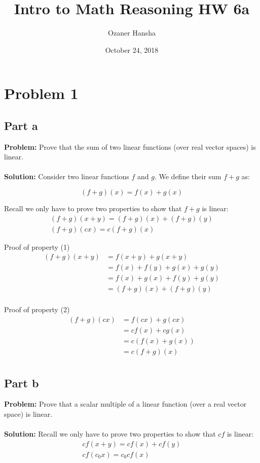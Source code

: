 \documentclass{article}
\begin{document}
\title{Intro to Math Reasoning HW 6a}
\author{Ozaner Hansha}
\date{October 24, 2018}
\maketitle

\section*{Problem 1}
\subsection*{Part a}
\textbf{Problem:} Prove that the sum of two linear functions (over real vector spaces) is linear.
\\\\
\textbf{Solution:} Consider two linear functions $f$ and $g$. We define their sum $f+g$ as:

$$(f+g)(x)=f(x)+g(x)$$

Recall we only have to prove two properties to show that $f+g$ is linear:
\begin{gather}
(f+g)(x+y)=(f+g)(x)+(f+g)(y)\\
(f+g)(cx)=c(f+g)(x)
\end{gather}

Proof of property (1)
\begin{align*}
  (f+g)(x+y)&=f(x+y)+g(x+y)\tag{def. of $f+g$}\\
  &=f(x)+f(y)+g(x)+g(y)\tag{Linearity of $f$ \& $g$}\\
  &=f(x)+g(x)+f(y)+g(y)\tag{Commutativity of $+$}\\
  &=(f+g)(x)+(f+g)(y)\tag{def. of $f+g$}\\
\end{align*}

Proof of property (2)
\begin{align*}
  (f+g)(cx)&=f(cx)+g(cx)\tag{def. of $f+g$}\\
  &=cf(x)+cg(x)\tag{Linearity of $f$ \& $g$}\\
  &=c(f(x)+g(x))\tag{Distributivity of $+$ \& $\times$}\\
  &=c(f+g)(x)\tag{def. of $f+g$}\\
\end{align*}

\subsection*{Part b}
\textbf{Problem:} Prove that a scalar multiple of a linear function (over a real vector space) is linear.
\\\\
\textbf{Solution:} Recall we only have to prove two properties to show that $cf$ is linear:
\begin{gather}
cf(x+y)=cf(x)+cf(y)\\
cf(c_0x)=c_0cf(x)
\end{gather}
\end{document}
